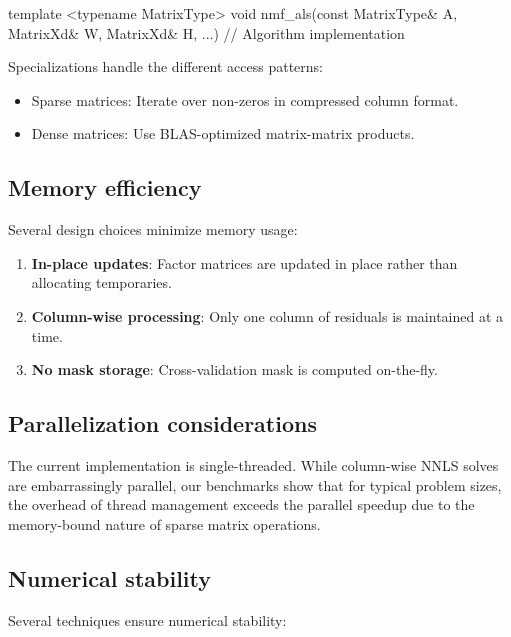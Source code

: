 \documentclass[article]{jss_modified}
\begin{document}
\begin{CodeChunk}
\begin{CodeInput}
template <typename MatrixType>
void nmf_als(const MatrixType& A, MatrixXd& W, MatrixXd& H, ...) {
  // Algorithm implementation
}
\end{CodeInput}
\end{CodeChunk}

Specializations handle the different access patterns:
\begin{itemize}
  \item Sparse matrices: Iterate over non-zeros in compressed column format.
  \item Dense matrices: Use BLAS-optimized matrix-matrix products.
\end{itemize}

\subsection{Memory efficiency}

Several design choices minimize memory usage:

\begin{enumerate}
  \item \textbf{In-place updates}: Factor matrices are updated in place rather 
  than allocating temporaries.
  \item \textbf{Column-wise processing}: Only one column of residuals is 
  maintained at a time.
  \item \textbf{No mask storage}: Cross-validation mask is computed on-the-fly.
\end{enumerate}

\subsection{Parallelization considerations}

The current implementation is single-threaded. While column-wise NNLS solves are 
embarrassingly parallel, our benchmarks show that for typical problem sizes, the 
overhead of thread management exceeds the parallel speedup due to the memory-bound 
nature of sparse matrix operations.

\subsection{Numerical stability}

Several techniques ensure numerical stability:
\end{document}
